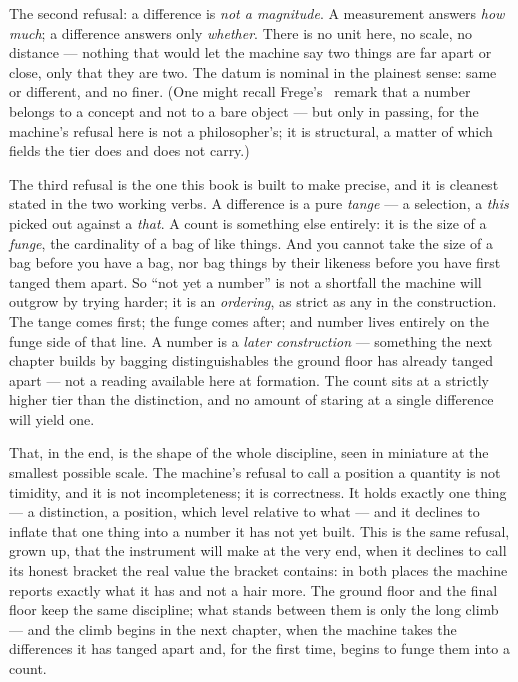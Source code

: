 The second refusal: a difference is \emph{not a magnitude}. A measurement answers \emph{how much}; a difference
answers only \emph{whether}. There is no unit here, no scale, no distance --- nothing that would let the machine say
two things are far apart or close, only that they are two. The datum is nominal in the plainest sense: same or
different, and no finer. (One might recall Frege's~\cite{frege1884} remark that a number belongs to a concept and not
to a bare object --- but only in passing, for the machine's refusal here is not a philosopher's; it is structural, a
matter of which fields the tier does and does not carry.)

The third refusal is the one this book is built to make precise, and it is cleanest stated in the two working verbs.
A difference is a pure \emph{tange} --- a selection, a \emph{this} picked out against a \emph{that}. A count is
something else entirely: it is the size of a \emph{funge}, the cardinality of a bag of like things. And you cannot
take the size of a bag before you have a bag, nor bag things by their likeness before you have first tanged them
apart. So ``not yet a number'' is not a shortfall the machine will outgrow by trying harder; it is an \emph{ordering},
as strict as any in the construction. The tange comes first; the funge comes after; and number lives entirely on the
funge side of that line. A number is a \emph{later construction} --- something the next chapter builds by bagging
distinguishables the ground floor has already tanged apart --- not a reading available here at formation. The count
sits at a strictly higher tier than the distinction, and no amount of staring at a single difference will yield one.

That, in the end, is the shape of the whole discipline, seen in miniature at the smallest possible scale. The
machine's refusal to call a position a quantity is not timidity, and it is not incompleteness; it is correctness. It
holds exactly one thing --- a distinction, a position, which level relative to what --- and it declines to inflate
that one thing into a number it has not yet built. This is the same refusal, grown up, that the instrument will make
at the very end, when it declines to call its honest bracket the real value the bracket contains: in both places the
machine reports exactly what it has and not a hair more. The ground floor and the final floor keep the same
discipline; what stands between them is only the long climb --- and the climb begins in the next chapter, when the
machine takes the differences it has tanged apart and, for the first time, begins to funge them into a count.
